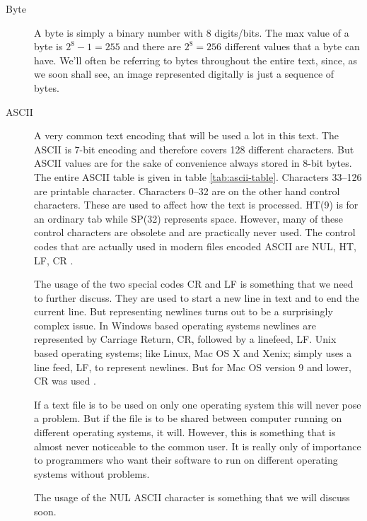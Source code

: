 \begin{description}
\item[Byte] A byte is simply a binary number with 8 digits/bits. The
  max value of a byte is $2^8 - 1 = 255$ and there are $2^8 = 256$
  different values that a byte can have. We'll often be referring to
  bytes throughout the entire text, since, as we soon shall see, an
  image represented digitally is just a sequence of bytes.

\item[ASCII] A very common text encoding that will be used a lot in
  this text. The ASCII is 7-bit encoding and therefore covers 128
  different characters. But ASCII values are for the sake of
  convenience always stored in 8-bit bytes. The entire ASCII table is
  given in table \ref{tab:ascii-table}\cite{rfc20}. Characters 33--126
  are printable character. Characters 0--32 are on the other hand
  control characters. These are used to affect how the text is
  processed. HT(9) is for an ordinary tab while SP(32) represents
  space. However, many of these control characters are obsolete and
  are practically never used. The control codes that are actually used
  in modern files encoded ASCII are NUL, HT, LF,
  CR \cite{maini2007digital}.

  The usage of the two special codes CR and LF is something that we
  need to further discuss. They are used to start a new line in text
  and to end the current line. But representing newlines turns out to
  be a surprisingly complex issue. In Windows based operating systems
  newlines are represented by Carriage Return, CR, followed by a
  linefeed, LF. Unix based operating systems; like Linux, Mac OS X and
  Xenix; simply uses a line feed, LF, to represent newlines. But for
  Mac OS version 9 and lower, CR was used  \cite{robbins:_common_newline,noria:_under_newlin_oreilly,editor:_end_line_story_rfc,tancig01:_apart_no_more_newline,corporation08:_creat_telep_applic_both_window_linux}.


  If a text file is to be used on only one operating system this will
  never pose a problem. But if the file is to be shared between
  computer running on different operating systems, it will. However,
  this is something that is almost never noticeable to the common
  user. It is really only of importance to programmers who want their
  software to run on different operating systems without problems.

  The usage of the NUL ASCII character is something that we will
  discuss soon.


\end{description}
